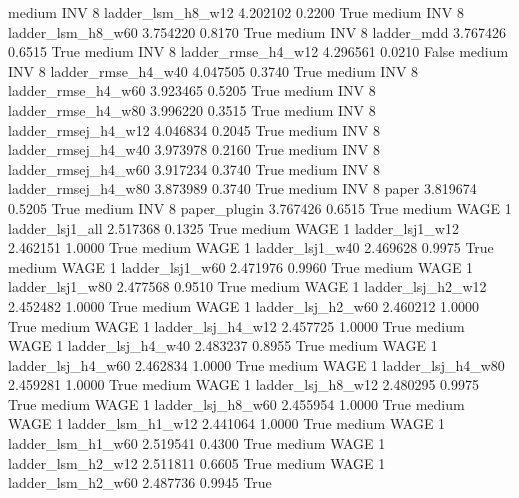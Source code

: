     medium      INV                 8   ladder_lsm_h8_w12   4.202102      0.2200    True
    medium      INV                 8   ladder_lsm_h8_w60   3.754220      0.8170    True
    medium      INV                 8          ladder_mdd   3.767426      0.6515    True
    medium      INV                 8  ladder_rmse_h4_w12   4.296561      0.0210   False
    medium      INV                 8  ladder_rmse_h4_w40   4.047505      0.3740    True
    medium      INV                 8  ladder_rmse_h4_w60   3.923465      0.5205    True
    medium      INV                 8  ladder_rmse_h4_w80   3.996220      0.3515    True
    medium      INV                 8 ladder_rmsej_h4_w12   4.046834      0.2045    True
    medium      INV                 8 ladder_rmsej_h4_w40   3.973978      0.2160    True
    medium      INV                 8 ladder_rmsej_h4_w60   3.917234      0.3740    True
    medium      INV                 8 ladder_rmsej_h4_w80   3.873989      0.3740    True
    medium      INV                 8               paper   3.819674      0.5205    True
    medium      INV                 8        paper_plugin   3.767426      0.6515    True
    medium     WAGE                 1     ladder_lsj1_all   2.517368      0.1325    True
    medium     WAGE                 1     ladder_lsj1_w12   2.462151      1.0000    True
    medium     WAGE                 1     ladder_lsj1_w40   2.469628      0.9975    True
    medium     WAGE                 1     ladder_lsj1_w60   2.471976      0.9960    True
    medium     WAGE                 1     ladder_lsj1_w80   2.477568      0.9510    True
    medium     WAGE                 1   ladder_lsj_h2_w12   2.452482      1.0000    True
    medium     WAGE                 1   ladder_lsj_h2_w60   2.460212      1.0000    True
    medium     WAGE                 1   ladder_lsj_h4_w12   2.457725      1.0000    True
    medium     WAGE                 1   ladder_lsj_h4_w40   2.483237      0.8955    True
    medium     WAGE                 1   ladder_lsj_h4_w60   2.462834      1.0000    True
    medium     WAGE                 1   ladder_lsj_h4_w80   2.459281      1.0000    True
    medium     WAGE                 1   ladder_lsj_h8_w12   2.480295      0.9975    True
    medium     WAGE                 1   ladder_lsj_h8_w60   2.455954      1.0000    True
    medium     WAGE                 1   ladder_lsm_h1_w12   2.441064      1.0000    True
    medium     WAGE                 1   ladder_lsm_h1_w60   2.519541      0.4300    True
    medium     WAGE                 1   ladder_lsm_h2_w12   2.511811      0.6605    True
    medium     WAGE                 1   ladder_lsm_h2_w60   2.487736      0.9945    True
